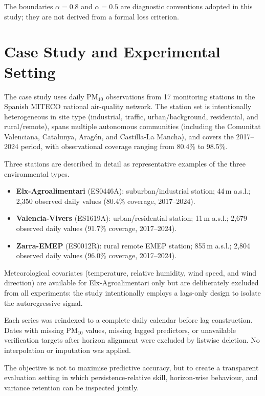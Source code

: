 \documentclass[3p,times,single-column]{elsarticle}
\begin{document}
The boundaries $\alpha = 0.8$ and $\alpha = 0.5$ are diagnostic conventions adopted in this study; they are not derived from a formal loss criterion.

\section{Case Study and Experimental Setting}

The case study uses daily PM$_{10}$ observations from 17 monitoring stations in the Spanish MITECO national air-quality network. The station set is intentionally heterogeneous in site type (industrial, traffic, urban/background, residential, and rural/remote), spans multiple autonomous communities (including the Comunitat Valenciana, Catalunya, Arag\'on, and Castilla-La Mancha), and covers the 2017--2024 period, with observational coverage ranging from 80.4\% to 98.5\%.

Three stations are described in detail as representative examples of the three environmental types.

\begin{itemize}
  \item \textbf{Elx-Agroalimentari} (ES0446A): suburban/industrial station; 44\,m a.s.l.; 2,350 observed daily values (80.4\% coverage, 2017--2024).
  \item \textbf{Valencia-Vivers} (ES1619A): urban/residential station; 11\,m a.s.l.; 2,679 observed daily values (91.7\% coverage, 2017--2024).
  \item \textbf{Zarra-EMEP} (ES0012R): rural remote EMEP station; 855\,m a.s.l.; 2,804 observed daily values (96.0\% coverage, 2017--2024).
\end{itemize}

Meteorological covariates (temperature, relative humidity, wind speed,
and wind direction) are available for Elx-Agroalimentari only but are
deliberately excluded from all experiments: the study intentionally employs a lags-only design to isolate the autoregressive signal.

Each series was reindexed to a complete daily calendar before lag
construction. Dates with missing PM$_{10}$ values, missing lagged
predictors, or unavailable verification targets after horizon alignment
were excluded by listwise deletion. No interpolation or imputation was
applied.

The objective is not to maximise predictive accuracy, but to create a transparent evaluation setting in which persistence-relative skill, horizon-wise behaviour, and variance retention can be inspected jointly.
\end{document}
